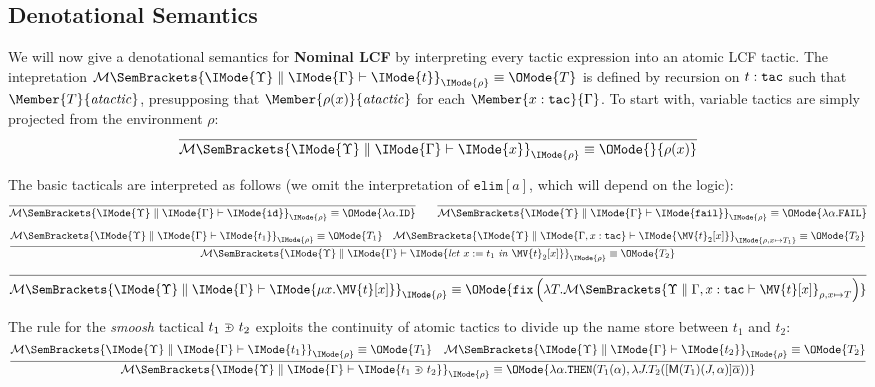 \subsection{Denotational Semantics}

\newcommand\LCFElaboration[5]{%
  \mathcal{M}%
  \SemBrackets{
    #1\parallel #2\vdash%
    #3%
  }_{#5}%
}

\newcommand\LCFElab[6]{%
  \LCFElaboration{\IMode{#1}}{\IMode{#2}}{\IMode{#3}}{\IMode{#4}}{\IMode{#5}}%
  \equiv\OMode{#6}%
}

We will now give a denotational semantics for \textbf{Nominal LCF} by
interpreting every tactic expression into an atomic LCF tactic. The
intepretation $\LCFElab{\Upsilon}{\Gamma}{t}{\tau}{\rho}{T}$ is defined by
recursion on $t:\mathtt{tac}$ such that $\Member{T}{\LCFAtomicTactic}$,
presupposing that $\Member{\rho(x)}{\LCFAtomicTactic}$ for each
$\Member{x:\SortTac}{\Gamma}$.  To start with, variable tactics are simply
projected from the environment $\rho$:
\[
  \infer{
    \LCFElab{\Upsilon}{\Gamma}{x}{\SortTac}{\rho}{}{\rho(x)}
  }{
  }
\]

The basic tacticals are interpreted as follows (we omit the interpretation of
$\mathtt{elim}[a]$, which will depend on the logic):
\[
  \infer{
    \LCFElab{\Upsilon}{\Gamma}{\mathtt{id}}{\SortTac}{\rho}{
      \lambda\alpha.\mathtt{ID}
    }
  }{
  }
  \qquad
  \infer{
    \LCFElab{\Upsilon}{\Gamma}{\mathtt{fail}}{\SortTac}{\rho}{
      \lambda\alpha.\mathtt{FAIL}
    }
  }{
  }
\]
\[
  \infer{
    \LCFElab{\Upsilon}{\Gamma}{\TacLet{t_1}{x}{\MV{t}_2[x]}}{\SortTac}{\rho}{
      T_2
    }
  }{
    \LCFElab{\Upsilon}{\Gamma}{t_1}{\SortTac}{\rho}{T_1} &
    \LCFElab{\Upsilon}{\Gamma,x:\SortTac}{\MV{t}_2[x]}{\SortTac}{
      \rho,x\mapsto T_1
    }{
      T_2
    }
  }
\]
\[
  \infer{
    \LCFElab{\Upsilon}{\Gamma}{\TacFix{x}{\MV{t}[x]}}{\SortTac}{\rho}{
      \mathtt{fix}%
      \left(\lambda T.
        \LCFElaboration{\Upsilon}{\Gamma,x:\SortTac}{\MV{t}[x]}{\SortTac}{\rho,x\mapsto T}
      \right)
    }
  }{
  }
\]

The rule for the \emph{smoosh} tactical $t_1\supsetplus t_2$ exploits the
continuity of atomic tactics to divide up the name store between $t_1$ and $t_2$:
\[
  \infer{
    \LCFElab{\Upsilon}{\Gamma}{\TacSmoosh{t_1}{t_2}}{\SortTac}{\rho}{
      \lambda\alpha.\mathtt{THEN}(T_1(\alpha),\lambda J. T_2(\StreamChop{\alpha}{\ModC{T_1}(J,\alpha)}))
    }
  }{
    \LCFElab{\Upsilon}{\Gamma}{t_1}{\SortTac}{\rho}{T_1} &
    \LCFElab{\Upsilon}{\Gamma}{t_2}{\SortTac}{\rho}{T_2}
  }
\]

